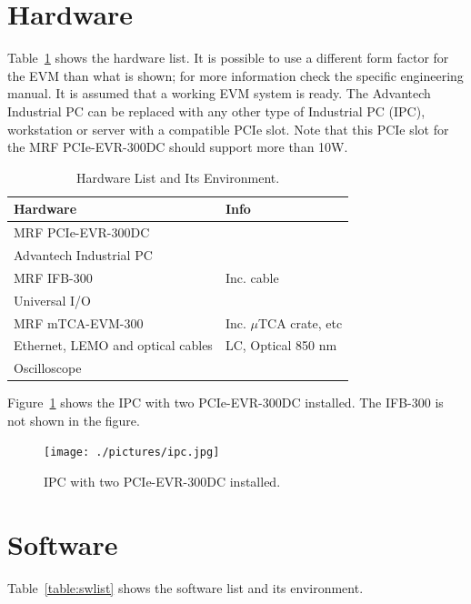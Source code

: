 \documentclass[11pt
  , a4paper
  , article
  , oneside
  , showtrims
]{memoir}
\begin{document}
\section{Hardware}
Table~\ref{table:hwlist} shows the hardware list. It is possible to use a different form factor for the EVM than what is shown; for more information check the specific engineering manual. It is assumed that a working EVM system is ready. The Advantech Industrial PC can be replaced with any other type of Industrial PC (IPC), workstation or server with a compatible PCIe slot. Note that this PCIe slot for the MRF PCIe-EVR-300DC should support more than 10W.
\begin{table}[!hb]
  \centering
  \begin{tabular}{l|l}
    \toprule
    Hardware                          & Info                      \\\midrule
    MRF PCIe-EVR-300DC                &                           \\\midrule
    Advantech Industrial PC           &                           \\\midrule
    MRF IFB-300                       & Inc. cable                \\\midrule
    Universal I/O                     &                           \\\midrule
    MRF mTCA-EVM-300                  & Inc. $\mu$TCA crate, etc  \\\midrule
    Ethernet, LEMO and optical cables & LC, Optical 850 nm        \\\midrule
    Oscilloscope                      &                           \\\bottomrule
  \end{tabular}
  \caption[]{Hardware List and Its Environment.}
  \label{table:hwlist}
\end{table}

Figure~\ref{fig:ipc} shows the IPC with two PCIe-EVR-300DC installed. The IFB-300 is not shown in the figure.\\

\begin{figure}[!b]
  \centering
  \texttt{[image: ./pictures/ipc.jpg]}
  \caption{IPC with two PCIe-EVR-300DC installed.}
  \label{fig:ipc}
\end{figure}


\section{Software}
Table~\ref{table:swlist} shows the software list and its environment.
\end{document}
